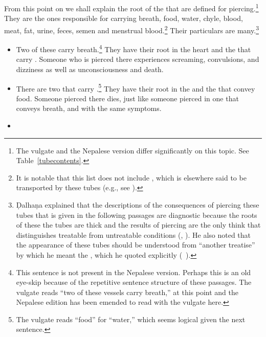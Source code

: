 \begin{translation}
From this point on we shall explain the root of the
 that are defined for piercing.\footnote{The
    vulgate and the Nepalese version differ significantly on this topic.
    See Table~\ref{tubecontents}.}  They are the ones responsible for
    carrying breath, food, water, chyle, blood, meat, fat, urine, feces,
    semen and menstrual blood.\footnote{It is notable that this list does not 
    include , which is elsewhere said to be transported by 
    these tubes (e.g., see \pageref{sanjnavahasrotas}).}  Their particulars are
    many.\footnote{Ḍalhaṇa explained that the descriptions of the
        consequences of piercing these tubes that is given in the following
        passages are diagnostic because the roots of these the tubes are thick
        and the results of piercing are the only think that distinguishes
        treatable from untreatable conditions (, ).  He also noted that the appearance 
        of these tubes should be understood from “another treatise” by which he 
        meant the \CS, which he quoted explicitly (\CS\ ).}
    
    \begin{itemize}
\item 

Two of these carry breath.\footnote{This sentence is not present in
    the Nepalese version.  Perhaps this is an old eye-skip because of the
    repetitive sentence structure of these passages.  The vulgate reads
     “two of these vessels carry breath,” at this
    point and the Nepalese edition has been emended to read with the
    vulgate here.} They have their root in the heart and the
     that carry . Someone who is
    pierced there experiences screaming, convulsions, and dizziness as
    well as unconsciousness and death. \item There are two that carry
    .\footnote{The vulgate reads “food” for “water,”
        which seems logical given the next sentence.} They have their root in
        the  and the  that convey
        food.  Someone pierced there dies, just like someone pierced in one
        that conveys breath, and with the same symptoms.
  
\item   


\end{itemize}
\end{translation}
